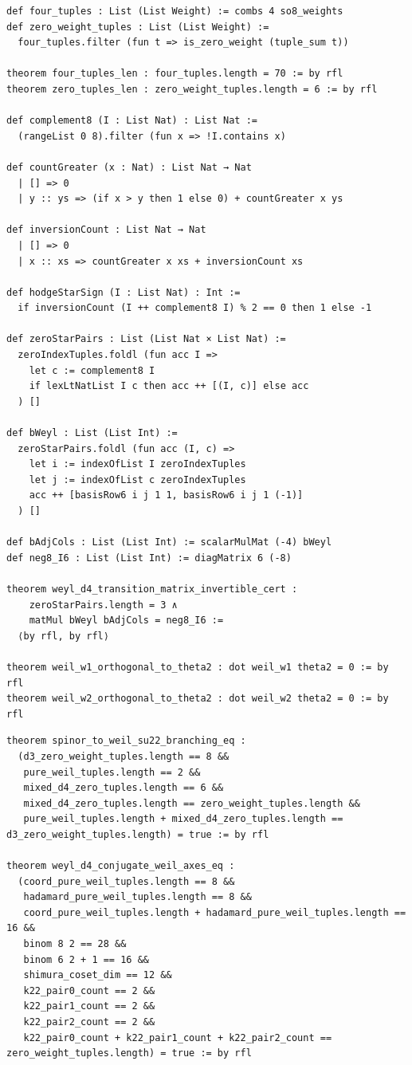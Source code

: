 \documentclass[11pt,a4paper]{article}
\begin{document}
\begin{lstlisting}[caption={Cartan zero-weight states, Hodge-star pairs, $B_{\mathrm{Weyl}}$ invertibility, and Weil orthogonality.}]
def four_tuples : List (List Weight) := combs 4 so8_weights
def zero_weight_tuples : List (List Weight) :=
  four_tuples.filter (fun t => is_zero_weight (tuple_sum t))

theorem four_tuples_len : four_tuples.length = 70 := by rfl
theorem zero_tuples_len : zero_weight_tuples.length = 6 := by rfl

def complement8 (I : List Nat) : List Nat :=
  (rangeList 0 8).filter (fun x => !I.contains x)

def countGreater (x : Nat) : List Nat → Nat
  | [] => 0
  | y :: ys => (if x > y then 1 else 0) + countGreater x ys

def inversionCount : List Nat → Nat
  | [] => 0
  | x :: xs => countGreater x xs + inversionCount xs

def hodgeStarSign (I : List Nat) : Int :=
  if inversionCount (I ++ complement8 I) % 2 == 0 then 1 else -1

def zeroStarPairs : List (List Nat × List Nat) :=
  zeroIndexTuples.foldl (fun acc I =>
    let c := complement8 I
    if lexLtNatList I c then acc ++ [(I, c)] else acc
  ) []

def bWeyl : List (List Int) :=
  zeroStarPairs.foldl (fun acc (I, c) =>
    let i := indexOfList I zeroIndexTuples
    let j := indexOfList c zeroIndexTuples
    acc ++ [basisRow6 i j 1 1, basisRow6 i j 1 (-1)]
  ) []

def bAdjCols : List (List Int) := scalarMulMat (-4) bWeyl
def neg8_I6 : List (List Int) := diagMatrix 6 (-8)

theorem weyl_d4_transition_matrix_invertible_cert :
    zeroStarPairs.length = 3 ∧
    matMul bWeyl bAdjCols = neg8_I6 :=
  ⟨by rfl, by rfl⟩

theorem weil_w1_orthogonal_to_theta2 : dot weil_w1 theta2 = 0 := by rfl
theorem weil_w2_orthogonal_to_theta2 : dot weil_w2 theta2 = 0 := by rfl
\end{lstlisting}

\begin{lstlisting}[caption={$\mathfrak{su}(2,2)$ branching and conjugate Weil axes theorems in \texttt{HodgeVerification.lean}.}]
theorem spinor_to_weil_su22_branching_eq :
  (d3_zero_weight_tuples.length == 8 &&
   pure_weil_tuples.length == 2 &&
   mixed_d4_zero_tuples.length == 6 &&
   mixed_d4_zero_tuples.length == zero_weight_tuples.length &&
   pure_weil_tuples.length + mixed_d4_zero_tuples.length == d3_zero_weight_tuples.length) = true := by rfl

theorem weyl_d4_conjugate_weil_axes_eq :
  (coord_pure_weil_tuples.length == 8 &&
   hadamard_pure_weil_tuples.length == 8 &&
   coord_pure_weil_tuples.length + hadamard_pure_weil_tuples.length == 16 &&
   binom 8 2 == 28 &&
   binom 6 2 + 1 == 16 &&
   shimura_coset_dim == 12 &&
   k22_pair0_count == 2 &&
   k22_pair1_count == 2 &&
   k22_pair2_count == 2 &&
   k22_pair0_count + k22_pair1_count + k22_pair2_count == zero_weight_tuples.length) = true := by rfl
\end{lstlisting}
\end{document}
